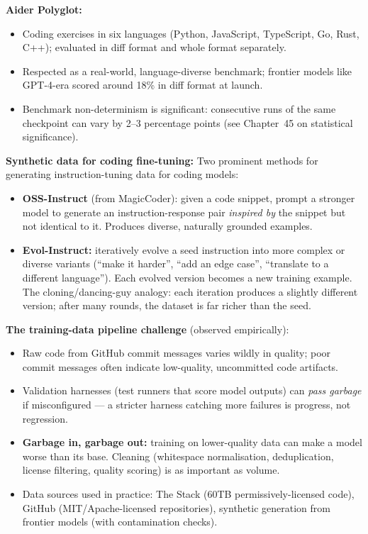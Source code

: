 \textbf{Aider Polyglot:}
\begin{itemize}
  \item Coding exercises in six languages (Python, JavaScript, TypeScript, Go, Rust,
    C++); evaluated in diff format and whole format separately.
  \item Respected as a real-world, language-diverse benchmark; frontier models like
    GPT-4-era scored around 18\% in diff format at launch.
  \item Benchmark non-determinism is significant: consecutive runs of the same
    checkpoint can vary by 2--3 percentage points (see Chapter~45 on statistical
    significance).
\end{itemize}

\textbf{Synthetic data for coding fine-tuning:}
Two prominent methods for generating instruction-tuning data for coding models:
\begin{itemize}
  \item \textbf{OSS-Instruct} (from MagicCoder): given a code snippet, prompt a
    stronger model to generate an instruction-response pair \emph{inspired by} the
    snippet but not identical to it. Produces diverse, naturally grounded examples.
  \item \textbf{Evol-Instruct:} iteratively evolve a seed instruction into more
    complex or diverse variants (``make it harder'', ``add an edge case'', ``translate
    to a different language''). Each evolved version becomes a new training example.
    The cloning/dancing-guy analogy: each iteration produces a slightly different
    version; after many rounds, the dataset is far richer than the seed.
\end{itemize}

\textbf{The training-data pipeline challenge} (observed empirically):
\begin{itemize}
  \item Raw code from GitHub commit messages varies wildly in quality; poor commit
    messages often indicate low-quality, uncommitted code artifacts.
  \item Validation harnesses (test runners that score model outputs) can \emph{pass
    garbage} if misconfigured --- a stricter harness catching more failures is
    progress, not regression.
  \item \textbf{Garbage in, garbage out:} training on lower-quality data can make a
    model worse than its base. Cleaning (whitespace normalisation, deduplication,
    license filtering, quality scoring) is as important as volume.
  \item Data sources used in practice: The Stack (60TB permissively-licensed code),
    GitHub (MIT/Apache-licensed repositories), synthetic generation from frontier
    models (with contamination checks).
\end{itemize}

